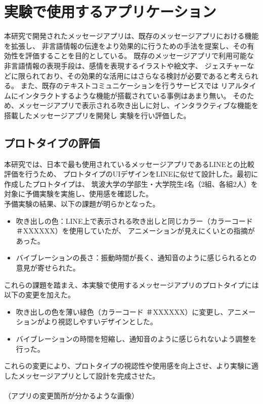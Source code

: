 \documentclass[11pt,a4paper]{ltjsreport}
\begin{document}
\section{実験で使用するアプリケーション}
本研究で開発されたメッセージアプリは、既存のメッセージアプリにおける機能を拡張し、
非言語情報の伝達をより効果的に行うための手法を提案し、その有効性を評価することを目的としている。
既存のメッセージアプリで利用可能な非言語情報の表現手段は、感情を表現するイラストや絵文字、
ジェスチャーなどに限られており、その効果的な活用にはさらなる検討が必要であると考えられる。
また、既存のテキストコミュニケーションを行うサービスでは
リアルタイムにインタラクトするような機能が搭載されている事例はあまり無い。
そのため、メッセージアプリで表示される吹き出しに対し、インタラクティブな機能を搭載したメッセージアプリを開発し
実験を行い評価した。

\subsection{プロトタイプの評価}
本研究では、日本で最も使用されているメッセージアプリであるLINEとの比較評価を行うため、
プロトタイプのUIデザインをLINEに似せて設計した。最初に作成したプロトタイプは、
筑波大学の学部生・大学院生4名（2組、各組2人）を対象に予備実験を実施し、使用感を確認した。\\

予備実験の結果、以下の課題が明らかとなった。
\begin{itemize}
    \item 吹き出しの色：LINE上で表示される吹き出しと同じカラー（カラーコード ＃XXXXXX）を使用していたが、
          アニメーションが見えにくいとの指摘があった。
    \item バイブレーションの長さ：振動時間が長く、通知音のように感じられるとの意見が寄せられた。
\end{itemize}

これらの課題を踏まえ、本実験で使用するメッセージアプリのプロトタイプには以下の変更を加えた。

\begin{itemize}
    \item 吹き出しの色を薄い緑色（カラーコード ＃XXXXXX）に変更し、アニメーションがより視認しやすいデザインとした。
    \item バイブレーションの時間を短縮し、通知音のように感じられないよう調整を行った。
\end{itemize}

これらの変更により、プロトタイプの視認性や使用感を向上させ、より実験に適したメッセージアプリとして設計を完成させた。
\\
\\
（アプリの変更箇所が分かるような画像）\\
\end{document}

